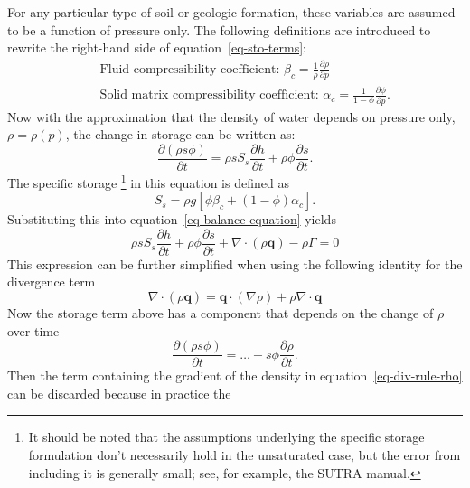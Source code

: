 \documentclass[fleqn]{article}
\begin{document}
For any particular type of soil or geologic formation, these variables
are assumed to be a function of pressure only. The following definitions
are introduced to rewrite the right-hand side of
equation~\ref{eq-sto-terms}:
\begin{eqnarray*}
  &&\text{Fluid compressibility coefficient: }
  \beta_c = \frac{1}{\rho} \frac{\partial \rho}{\partial p} \\
  &&\text{Solid matrix compressibility coefficient: }
  \alpha_c = \frac{1}{1 - \phi} \frac{\partial \phi}{\partial p}.
\end{eqnarray*}
Now with the approximation that the density of water depends on
pressure only, $\rho = \rho(p)$, the change in storage can be written as:
\begin{equation}
  \frac{\partial (\rho s \phi)}{\partial t} =
  \rho s S_s \frac{\partial h}{\partial t} +
  \rho \phi \frac{\partial s}{\partial t}.
  \label{eq-sto}
\end{equation}
The specific storage \footnote{It should be noted that the assumptions 
underlying the specific storage formulation don't necessarily hold in the unsaturated 
case, but the error from including it is generally small; see, for example, the 
SUTRA manual.} in this equation is defined as
\begin{equation}
  S_s = \rho g \left[ \phi \beta_c + (1 - \phi) \alpha_c \right].
  \label{eq-spec-sto}
\end{equation}
Substituting this into equation~\ref{eq-balance-equation} yields
\begin{equation}
  \rho s S_s \frac{\partial h}{\partial t} +
  \rho \phi \frac{\partial s}{\partial t} +
  \nabla \cdot (\rho \mathbf{q}) -
  \rho \Gamma = 0
  \label{eq-balance-equation-sto}
\end{equation}
This expression can be further simplified when using the
following identity for the divergence term
\begin{equation}
  \nabla \cdot (\rho \mathbf{q}) = 
    \mathbf{q} \cdot (\nabla \rho) + \rho \nabla \cdot \mathbf{q}
  \label{eq-div-rule-rho}
\end{equation}
Now the storage term above has a component that depends on the
change of $\rho$ over time
\begin{equation}
   \frac{\partial (\rho s \phi)}{\partial t} = \dots + 
    s \phi \frac{\partial \rho}{\partial t}.
\end{equation} 
Then the term containing the gradient of the density in
equation~\ref{eq-div-rule-rho} can be discarded because in practice the 
\end{document}
